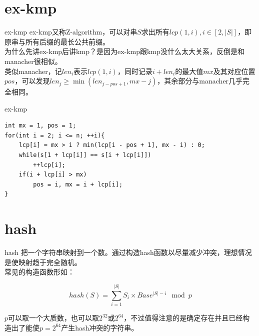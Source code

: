 \documentclass{beamer}
\begin{document}
\section{ex-kmp}
\begin{frame}{ex-kmp}
	ex-kmp又称Z-algorithm，可以对串$S$求出所有$lcp(1,i), i \in[2,|S|]$，即原串与所有后缀的最长公共前缀。
	\\
	
	为什么先讲ex-kmp后讲kmp？是因为ex-kmp跟kmp没什么太大关系，反倒是和manacher很相似。
	\\
	
	类似manacher，记$len_i$表示$lcp(1,i)$，同时记录$i+len_i$的最大值$mx$及其对应位置$pos$，可以发现$len_j \ge \min(len_{j-pos+1},mx-j)$，其余部分与manacher几乎完全相同。
\end{frame}
\begin{frame}[fragile]{ex-kmp}
	\begin{verbatim}
int mx = 1, pos = 1;
for(int i = 2; i <= n; ++i){
    lcp[i] = mx > i ? min(lcp[i - pos + 1], mx - i) : 0;
    while(s[1 + lcp[i]] == s[i + lcp[i]])
        ++lcp[i];
    if(i + lcp[i] > mx)
        pos = i, mx = i + lcp[i];
}
	\end{verbatim}
\end{frame}
\section{hash}
\begin{frame}{hash}
	把一个字符串映射到一个数。通过构造hash函数以尽量减少冲突，理想情况是使映射趋于完全随机。\\
	
	常见的构造函数形如：
	
	$$hash(S)=\sum_{i=1}^{|S|}S_i\times Base^{|S|-i} \mod p$$
	
	$p$可以取一个大质数，也可以取$2^{32}$或$2^{64}$，不过值得注意的是确定存在并且已经构造出了能使$p=2^{64}$产生hash冲突的字符串。
\end{frame}
\end{document}
